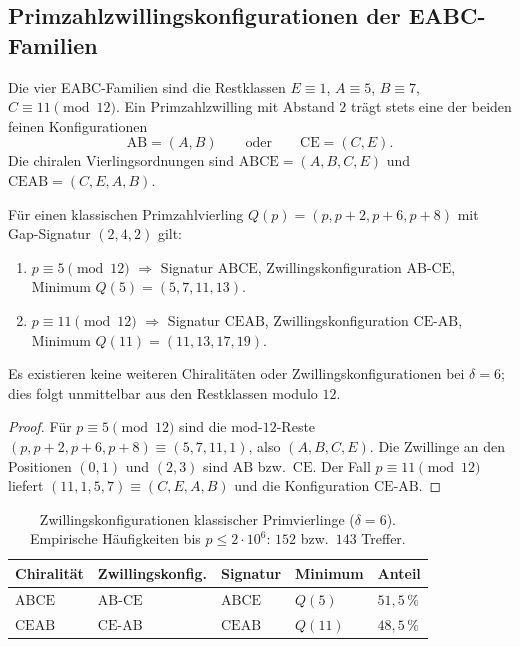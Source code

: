 \subsection{Primzahlzwillingskonfigurationen der EABC-Familien}

Die vier EABC-Familien sind die Restklassen
$E\equiv 1$, $A\equiv 5$, $B\equiv 7$, $C\equiv 11 \pmod{12}$.
Ein Primzahlzwilling mit Abstand $2$ trägt stets eine der beiden
feinen Konfigurationen
\[
  \mathrm{AB}=(A,B)
  \qquad\text{oder}\qquad
  \mathrm{CE}=(C,E).
\]
Die chiralen Vierlingsordnungen sind
$\mathrm{ABCE}=(A,B,C,E)$ und $\mathrm{CEAB}=(C,E,A,B)$.

\begin{theorem}
\label{thm:twin-config}
Für einen klassischen Primzahlvierling $Q(p)=(p,p+2,p+6,p+8)$ mit
Gap-Signatur $(2,4,2)$ gilt:
\begin{enumerate}
  \item $p\equiv 5\pmod{12}$ $\Rightarrow$
        Signatur $\mathrm{ABCE}$, Zwillingskonfiguration $\mathrm{AB\text{-}CE}$,
        Minimum $Q(5)=(5,7,11,13)$.
  \item $p\equiv 11\pmod{12}$ $\Rightarrow$
        Signatur $\mathrm{CEAB}$, Zwillingskonfiguration $\mathrm{CE\text{-}AB}$,
        Minimum $Q(11)=(11,13,17,19)$.
\end{enumerate}
Es existieren keine weiteren Chiralitäten oder Zwillingskonfigurationen
bei $\delta=6$; dies folgt unmittelbar aus den Restklassen modulo $12$.
\end{theorem}

\begin{proof}
Für $p\equiv 5\pmod{12}$ sind die mod-$12$-Reste
$(p,p+2,p+6,p+8)\equiv (5,7,11,1)$, also $(A,B,C,E)$.
Die Zwillinge an den Positionen $(0,1)$ und $(2,3)$ sind
$\mathrm{AB}$ bzw.\ $\mathrm{CE}$.
Der Fall $p\equiv 11\pmod{12}$ liefert $(11,1,5,7)\equiv (C,E,A,B)$
und die Konfiguration $\mathrm{CE\text{-}AB}$.
\end{proof}

\begin{table}[ht]
\centering
\caption{Zwillingskonfigurationen klassischer Primvierlinge ($\delta=6$).
Empirische Häufigkeiten bis $p\le 2\cdot 10^6$: $152$ bzw.\ $143$ Treffer.}
\label{tab:twin-config}
\begin{tabular}{lllll}
\toprule
Chiralität & Zwillingskonfig. & Signatur & Minimum & Anteil \\
\midrule
$\mathrm{ABCE}$ & $\mathrm{AB\text{-}CE}$ & $\mathrm{ABCE}$ & $Q(5)$ & $51{,}5\,\%$ \\
$\mathrm{CEAB}$ & $\mathrm{CE\text{-}AB}$ & $\mathrm{CEAB}$ & $Q(11)$ & $48{,}5\,\%$ \\
\bottomrule
\end{tabular}
\end{table}

